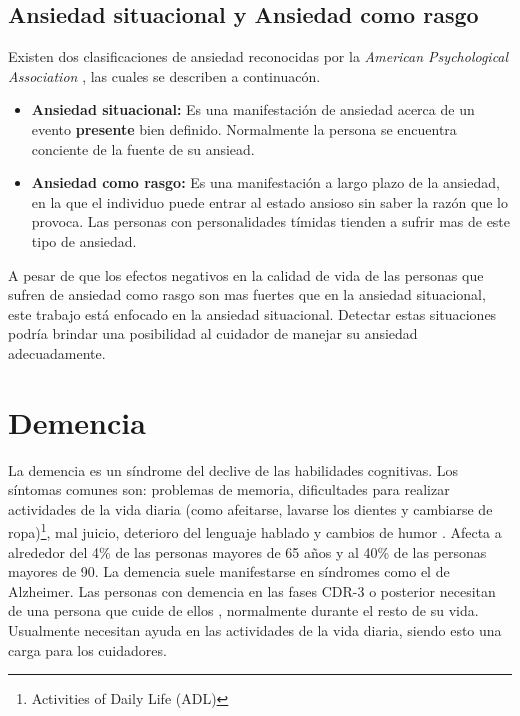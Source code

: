 \subsection{Ansiedad situacional y Ansiedad como rasgo}\label{secc:anxieystatevstrait}
Existen dos clasificaciones de ansiedad reconocidas por la \textit{American Psychological Association} \citep{psychologyapa} , las cuales se describen a continuac\'on.

\begin{itemize}
	\item{\textbf{Ansiedad situacional:}} Es una manifestaci\'on de ansiedad acerca de un evento \textbf{presente} bien definido. Normalmente la persona se encuentra conciente de la fuente de su ansiead. 
	\item{\textbf{Ansiedad como rasgo:}} Es una manifestaci\'on a largo plazo de la ansiedad, en la que el individuo puede entrar al estado ansioso sin saber la raz\'on que lo provoca. Las personas con personalidades t\'imidas tienden a sufrir mas de este tipo de ansiedad.

\end{itemize}

A pesar de que los efectos negativos en la calidad de vida de las personas que sufren de ansiedad como rasgo son mas fuertes que en la ansiedad situacional, este trabajo est\'a enfocado en la ansiedad situacional. Detectar estas situaciones podr\'ia brindar una posibilidad al cuidador de manejar su ansiedad adecuadamente.
\section{Demencia}\label{secc:dementia}
La demencia es un s\'indrome del declive de las habilidades cognitivas. Los s\'intomas comunes son: problemas de memoria, dificultades para realizar actividades de la vida diaria (como afeitarse, lavarse los dientes y cambiarse de ropa)\footnote{Activities of Daily Life (ADL)}, mal juicio, deterioro del lenguaje hablado y cambios de humor \citep{Aziz}. Afecta a alrededor del 4\% de las personas mayores de 65 a\~nos y al 40\% de las personas mayores de 90. La demencia suele manifestarse en s\'indromes como el de Alzheimer. Las personas con demencia en las fases CDR-3 o posterior necesitan de una persona que cuide de ellos \citep{meuser2001comprehensive}, normalmente durante el resto de su vida. Usualmente necesitan ayuda en las actividades de la vida diaria, siendo esto una carga para los cuidadores.

